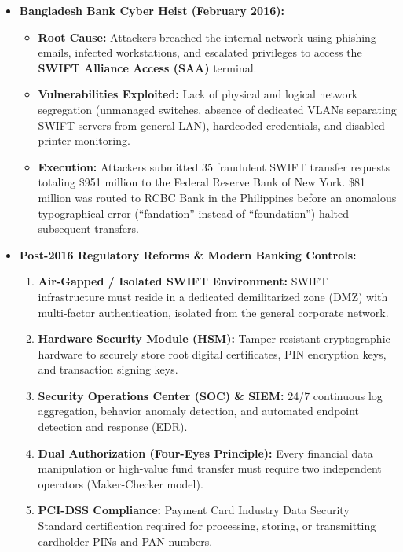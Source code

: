 \begin{itemize}
  \item \textbf{Bangladesh Bank Cyber Heist (February 2016):}
  \begin{itemize}
    \item \textbf{Root Cause:} Attackers breached the internal network using phishing emails, infected workstations, and escalated privileges to access the \textbf{SWIFT Alliance Access (SAA)} terminal.
    \item \textbf{Vulnerabilities Exploited:} Lack of physical and logical network segregation (unmanaged switches, absence of dedicated VLANs separating SWIFT servers from general LAN), hardcoded credentials, and disabled printer monitoring.
    \item \textbf{Execution:} Attackers submitted 35 fraudulent SWIFT transfer requests totaling \$951 million to the Federal Reserve Bank of New York. \$81 million was routed to RCBC Bank in the Philippines before an anomalous typographical error (``fandation'' instead of ``foundation'') halted subsequent transfers.
  \end{itemize}
  \item \textbf{Post-2016 Regulatory Reforms \& Modern Banking Controls:}
  \begin{enumerate}
    \item \textbf{Air-Gapped / Isolated SWIFT Environment:} SWIFT infrastructure must reside in a dedicated demilitarized zone (DMZ) with multi-factor authentication, isolated from the general corporate network.
    \item \textbf{Hardware Security Module (HSM):} Tamper-resistant cryptographic hardware to securely store root digital certificates, PIN encryption keys, and transaction signing keys.
    \item \textbf{Security Operations Center (SOC) \& SIEM:} 24/7 continuous log aggregation, behavior anomaly detection, and automated endpoint detection and response (EDR).
    \item \textbf{Dual Authorization (Four-Eyes Principle):} Every financial data manipulation or high-value fund transfer must require two independent operators (Maker-Checker model).
    \item \textbf{PCI-DSS Compliance:} Payment Card Industry Data Security Standard certification required for processing, storing, or transmitting cardholder PINs and PAN numbers.
  \end{enumerate}
\end{itemize}


